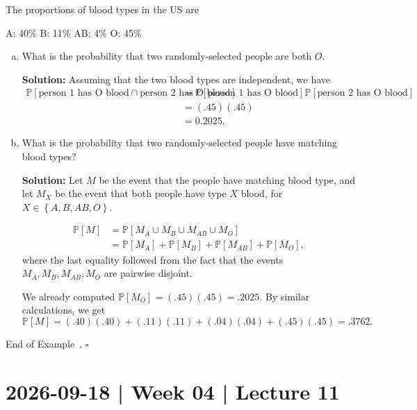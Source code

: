 \documentclass[10pt]{article}
\theoremstyle{definition}
\newtheorem{example}[theorem]{Example}
\renewenvironment{example}
{\begin{oldexample}}
  {\par\smallskip\hfill   End of Example~\theexample. $\square$    \par\end{oldexample}}
\newcommand{\fl}{\noindent\textbf} %
\newcommand{\1}[1]{\textbf{1}_{\left[#1\right]}} %
\def\P{\mathbb{P}} %
\begin{document}
\begin{example}
  The proportions of blood types in the US are
  \begin{center}
    A: 40\% \quad  B: 11\% \quad AB: 4\% \quad O: 45\%
  \end{center}
  \begin{enumerate}[(a)]
    \item What is the probability that two randomly-selected people are both
    $O$.
    
    \fl{Solution:} Assuming that the two blood types are independent, we have
    \begin{align*}
      \P\left[ \text{person 1 has O blood} \cap \text{person 2 has O blood}
      \right] 
      &= \P\left[\text{person 1 has O blood} \right]
        \P\left[\text{person 2 has O blood} \right] \\
      &= (.45)(.45) \\
      &= 0.2025.
    \end{align*}
    \item What is the probability that two randomly-selected people have
    matching blood types?
    
    \fl{Solution:} Let $M$ be the event that the people have matching blood
    type, and let $M_{X}$ be the event that both people have type $X$
    blood, for $X\in \left\{A,B,AB,O\right\}$.

    \begin{align*}
      \P\left[M \right] 
      &= \P\left[M_{A}\cup M_{B}\cup M_{AB}\cup M_{O} \right]\\
      &= \P\left[M_{A} \right] + \P\left[M_{B} \right]+ \P\left[M_{AB} \right] + \P\left[M_{O} \right],
    \end{align*}
    where the last equality followed from the fact that the events
    $M_{A},M_{B},M_{AB},M_{O}$ are pairwise disjoint.
    
    We already computed $\P\left[M_{O} \right]= (.45)(.45) = .2025$. By similar calculations,
    we get
    \begin{equation*}
      \P\left[M \right] = (.40)(.40)+(.11)(.11)+ (.04)(.04) + (.45)(.45) = .3762.
    \end{equation*}
  \end{enumerate}
\end{example}

\newpage
\section{2026-09-18 | Week 04 | Lecture 11}
\end{document}
